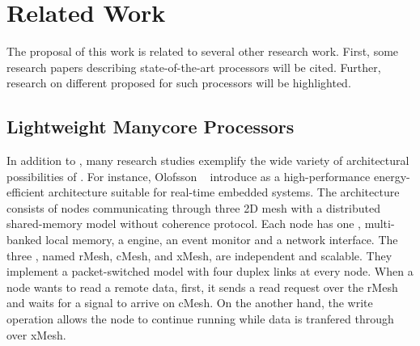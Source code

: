 \chapter{Related Work}
\label{ch.related-work}

The proposal of this work is related to several other research work.
First, some research papers describing state-of-the-art \lightweight \manycores
processors will be cited. Further, research on different \oss
proposed for such processors will be highlighted.

\section{Lightweight Manycore Processors}
\label{sec.works.manycores}

	In addition to \mppa, many research studies exemplify the wide variety of
	architectural possibilities of \lightweight \manycores.
	For instance, Olofsson \etal~\cite{olofsson2014} introduce \epiphany as a
	high-performance energy-efficient \manycore architecture suitable for
	real-time embedded systems.
	The architecture consists of nodes communicating through three 2D mesh \nocs
	with a distributed shared-memory model without coherence protocol.
	Each node has one \risc \cpu, multi-banked local memory, a \dma engine,
	an event monitor and a network interface.
	The three \nocs, named rMesh, cMesh, and xMesh, are independent and scalable.
	They implement a packet-switched model with four duplex links at every node.
	When a node wants to read a remote data, first, it sends a read request over
	the rMesh and waits for a signal to arrive on cMesh.
	On the another hand, the write operation allows the node to continue running
	while data is tranfered through over xMesh.

